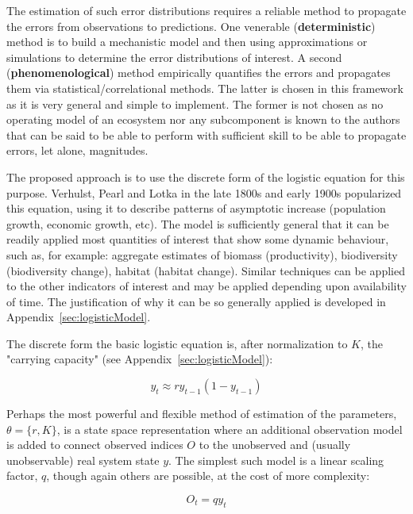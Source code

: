 \documentclass[letterpaper,portrait,11pt]{scrartcl}
\numberwithin{equation}{section}		%
\numberwithin{figure}{section}		%
\numberwithin{table}{section}				%
\begin{document}
The estimation of such error distributions requires a reliable method to propagate the errors from observations to predictions. One venerable (\textbf{deterministic}) method is to build a mechanistic model and then using approximations or simulations to determine the error distributions of interest. A second (\textbf{phenomenological}) method empirically quantifies the errors and propagates them via statistical/correlational methods. The latter is chosen in this framework as it is very general and simple to implement. The former is not chosen as no operating model of an ecosystem nor any subcomponent is known to the authors that can be said to be able to perform with sufficient skill to be able to propagate errors, let alone, magnitudes. 

The proposed approach is to use the discrete form of the logistic equation for this purpose. Verhulst, Pearl and Lotka in the late 1800s and early 1900s popularized this equation, using it to describe patterns of asymptotic increase (population growth, economic growth, etc). The model is sufficiently general that it can be readily applied most quantities of interest that show some dynamic behaviour, such as, for example: aggregate estimates of biomass (productivity), biodiversity (biodiversity change), habitat (habitat change). Similar techniques can be applied to the other indicators of interest and may be applied depending upon availability of time. The justification of why it can be so generally applied is developed in Appendix~\ref{sec:logisticModel}.

The discrete form the basic logistic equation is, after normalization to $K$, the "carrying capacity" (see Appendix~\ref{sec:logisticModel}):

\begin{equation} 
\label{eqLogisticDiscrete}
y_t  \approx r y_{t-1} (1 - y_{t-1} )
\end{equation}

Perhaps the most powerful and flexible method of estimation of the parameters, $\theta=\{r,K\}$, is a state space representation where an additional observation model is added to connect observed indices $O$ to the unobserved and (usually unobservable) real system state $y$. The simplest such model is a linear scaling factor, $q$, though again others are possible, at the cost of more complexity: 

\begin{equation} 
\label{eqLogisticDiscreteStateSpace}
O_t = q y_t
\end{equation}
\end{document}
